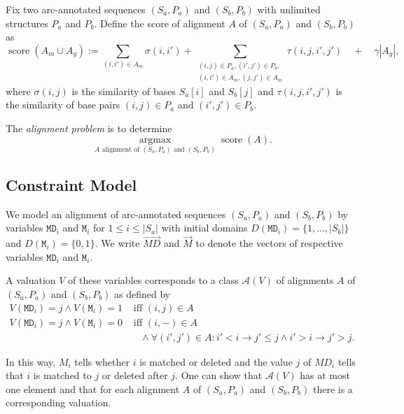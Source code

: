 \documentclass[11pt]{llncs}
\newcommand{\score}{\operatorname{score}}
\newcommand{\argmax}{\operatorname*{arg max}}
\begin{document}
Fix two arc-annotated sequences $(S_a,P_a)$ and $(S_b,P_b)$ with
unlimited structures $P_a$ and $P_b$. Define the score of alignment $A$
of $(S_a,P_a)$ and $(S_b,P_b)$ as
\begin{displaymath}
  \score(A_m\cup A_g) :=
  \sum_{(i,i')\in A_m} \sigma(i,i')
  + \sum_{\substack{(i,j)\in P_a,(i',j')\in P_b,\\(i,i')\in A_m,(j,j')\in A_m}} \tau(i,j,i',j')
  \quad + \quad\gamma |A_g|,
\end{displaymath}
where $\sigma(i,j)$ is the similarity of bases $S_a[i]$ and $S_b[j]$
and $\tau(i,j,i',j')$ is the similarity of base pairs $(i,j)\in P_a$
and $(i',j')\in P_b$.

The \emph{alignment problem} is to determine 
\begin{displaymath}
  \argmax_{\text{$A$ alignment of $(S_a,P_a)$ and $(S_b,P_b)$}} \score(A).
\end{displaymath}


\newcommand{\var}{\texttt}
\newcommand{\cA}{{\mathcal A}}
\subsection{Constraint Model}

We model an alignment of arc-annotated sequences $(S_a,P_a)$ and
$(S_b,P_b)$ by variables $\var{MD}_i$ and $\var{M}_i$ for $1\leq i\leq
|S_a|$ with initial domains $D(\var{MD}_i) = \{1,\dots,|S_b|\}$ and
$D(\var{M}_i)=\{0,1\}$. We write $\vec{MD}$ and $\vec{M}$ to
denote the vectors of respective variables $\var{MD}_i$ and
$\var{M}_i$.

A valuation $V$ of these variables corresponds to a class $\cA(V)$ of
alignments $A$ of $(S_a,P_a)$ and $(S_b,P_b)$ as defined by
\begin{align*}
  V(\var{MD}_i)=j \land V(\var{M}_i)=1 &\text{ iff } (i,j) \in A  \\
  V(\var{MD}_i)=j \land V(\var{M}_i)=0 &\text{ iff } (i,-) \in A \\&\quad\land \forall (i',j')\in A: i'< i \rightarrow j'\leq j \land i'>i \rightarrow j'>j.
\end{align*}

In this way, $M_i$ tells whether $i$ is matched or deleted and the
value $j$ of $MD_i$ tells that $i$ is matched to $j$ or deleted after
$j$. One can show that $\cA(V)$ has at most one element and that for
each alignment $A$ of $(S_a,P_a)$ and $(S_b,P_b)$ there is a
corresponding valuation.
\end{document}
